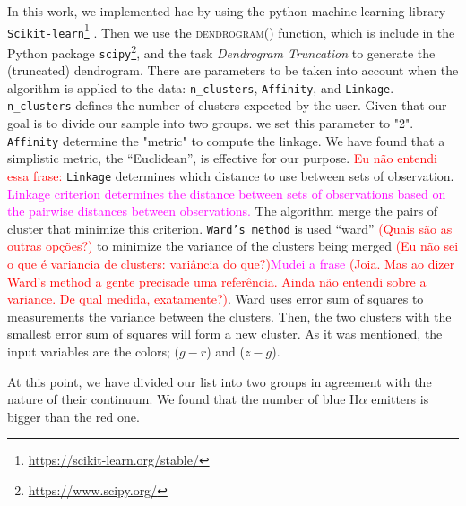 \documentclass[fleqn,usenatbib]{mnras}
\newcommand{\comment}[1]{\textcolor{red}{#1}}
\newcommand{\luis}[1]{\textcolor{magenta}{#1}}
\begin{document}
In this work, we implemented {\sc hac} by using the python machine learning library
\texttt{Scikit-learn}\footnote{\url{https://scikit-learn.org/stable/}} \citep{Pedregosa:2011}. Then we use the \textsc{dendrogram()} function, which is 
include in the Python package \texttt{scipy}\footnote{\url{https://www.scipy.org/}}, and the task \textit{Dendrogram Truncation}
to generate the (truncated) dendrogram.
There are  parameters to  be taken into account
when the algorithm is applied to the data: \texttt{n\_clusters}, \texttt{Affinity}, and \texttt{Linkage}.
\texttt{n\_clusters} 
defines the number of clusters expected by the user.
Given that our goal is to divide our sample  into two groups. we set this  parameter to "2". \texttt{Affinity} 
determine
the "metric" to compute the linkage. 
We have found that a simplistic metric, the ``Euclidean'', is effective for our purpose.
\comment{Eu não entendi essa frase:} \texttt{Linkage} determines which distance to use between sets of observation. \luis{Linkage criterion determines the distance between sets of observations based on the pairwise distances between observations.}
The algorithm merge the pairs of cluster that minimize this criterion. \texttt{Ward's method} is used 
``ward'' \comment{(Quais são as outras opções?)} to minimize the variance of the clusters being merged \comment{(Eu não sei o que é variancia de clusters: variância do que?)}\luis{Mudei a frase} \comment{(Joia. Mas ao dizer Ward's method a gente precisade uma referência. Ainda não entendi sobre a variance. De qual medida, exatamente?)}. Ward uses error sum of squares to measurements the variance between the clusters. Then, the two clusters with the smallest error sum of squares will form a new cluster.  As it was mentioned,
the input variables are the colors; ($g - r$) and ($z - g$).

At this point, 
we have divided our list  into two groups in agreement
with the nature of their continuum. We found that the number of blue H{$\alpha$}
emitters is bigger than the red one.
\end{document}
